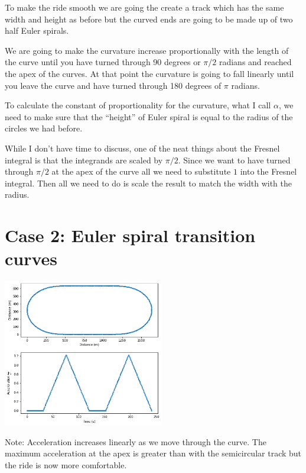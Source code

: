 \documentclass[]{article} %
\theoremstyle{definition}
\theoremstyle{theorem}
\begin{document}
To make the ride smooth we are going the create a track which has the same width and height as before but the curved ends are going to be made up of two half Euler spirals.

We are going to make the curvature increase proportionally with the length of the curve until you have turned through 90 degrees or $\pi/2$ radians and reached the apex of the curves. At that point the curvature is going to fall linearly until you leave the curve and have turned through 180 degrees of $\pi$ radians.

To calculate the constant of proportionality for the curvature, what I call $\alpha$, we need to make sure that the ``height'' of Euler spiral is equal to the radius of the circles we had before.

While I don't have time to discuss, one of the neat things about the Fresnel integral is that the integrands are scaled by $\pi/2$. Since we want to have turned through $\pi/2$ at the apex of the curve all we need to substitute $1$ into the Fresnel integral. Then all we need to do is scale the result to match the width with the radius. 


\section{Case 2: Euler spiral transition curves}
\begin{tcolorbox}
	\begin{minipage}{\linewidth}
		\centering
		\includegraphics[width=70mm, scale=0.2]{euler_track.png}
	\end{minipage}
	Note: Acceleration increases linearly as we move through the curve.		
	The maximum acceleration at the apex is greater than with the semicircular track but the ride is now more comfortable.
\end{tcolorbox}
\end{document}
